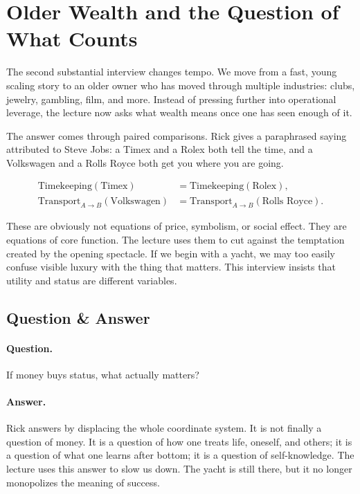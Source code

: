 \section{Older Wealth and the Question of What Counts}

The second substantial interview changes tempo. We move from a fast, young scaling story to an older owner who has moved through multiple industries: clubs, jewelry, gambling, film, and more. Instead of pressing further into operational leverage, the lecture now asks what wealth means once one has seen enough of it.

The answer comes through paired comparisons. Rick gives a paraphrased saying attributed to Steve Jobs: a Timex and a Rolex both tell the time, and a Volkswagen and a Rolls Royce both get you where you are going.

\begin{align}
\text{Timekeeping}(\text{Timex}) &= \text{Timekeeping}(\text{Rolex}),\\
\text{Transport}_{A\to B}(\text{Volkswagen}) &= \text{Transport}_{A\to B}(\text{Rolls Royce}).
\end{align}

These are obviously not equations of price, symbolism, or social effect. They are equations of core function. The lecture uses them to cut against the temptation created by the opening spectacle. If we begin with a yacht, we may too easily confuse visible luxury with the thing that matters. This interview insists that utility and status are different variables.

\subsection{Question \& Answer}

\paragraph{Question.}
If money buys status, what actually matters?

\paragraph{Answer.}
Rick answers by displacing the whole coordinate system. It is not finally a question of money. It is a question of how one treats life, oneself, and others; it is a question of what one learns after bottom; it is a question of self-knowledge. The lecture uses this answer to slow us down. The yacht is still there, but it no longer monopolizes the meaning of success.

